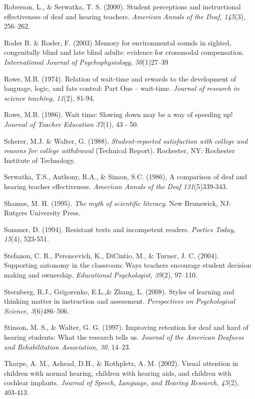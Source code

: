 \documentclass[11.5pt]{sig-alternate} %
\begin{document}
Roberson, L., \& Serwatka, T. S. (2000). Student perceptions and instructional effectiveness of deaf and hearing teachers. \textit{American Annals of the Deaf, 145}(3), 256–262. 

Roder B. \& Rosler, F. (2003) Memory for environmental sounds in sighted, congenitally blind and late blind adults: evidence for crossmodal compensation. \textit{International Journal of  Psychophysiology, 50}(1)27–39

Rowe, M.B. (1974). Relation of wait-time and rewards to the development of language, logic,  and fate control: Part One -- wait-time. \textit{Journal of research in science teaching, 11}(2), 81-94.

Rowe, M.B. (1986). Wait time: Slowing down may be a way of speeding up! \textit{Journal of Teacher Education 37}(1), 43 - 50.

Scherer, M.J. \& Walter, G. (1988). \textit{Student-reported satisfaction with college and reasons for college withdrawal} (Technical Report). Rochester, NY: Rochester Institute of Technology. 

Serwatka, T.S., Anthony, R.A., \& Simon, S.C. (1986), A comparison of deaf and hearing teacher effectiveness. \textit{American Annals of the Deaf 131}(5)339-343.

Shamos, M. H. (1995). \textit{The myth of scientific literacy}. New Brunswick, NJ: Rutgers University Press.

Sommer, D. (1994). Resistant texts and incompetent readers. \textit{Poetics Today, 15}(4), 523-551.  

Stefanou, C. R., Perencevich, K., DiCintio, M., \& Turner, J. C. (2004). Supporting autonomy in the classroom: Ways teachers encourage student decision making and ownership. \textit{Educational Psychologist, 39}(2), 97–110.

Sternberg, R.J., Grigorenko, E.L.,\& Zhang, L. (2008). Styles of learning and thinking matter in instruction and assessment. \textit{Perspectives on Psychological Science, 3}(6)486–506.

Stinson, M. S., \& Walter, G. G. (1997). Improving retention for deaf and hard of hearing students: What the research tells us. \textit{Journal of the American Deafness and Rehabilitation Association, 30}, 14–23.

Tharpe, A. M., Ashead, D.H., \& Rothpletz, A. M. (2002). Visual attention in children with normal hearing, children with hearing aids, and children with cochlear implants. \textit{Journal of Speech, Language, and Hearing Research, 45}(2), 403-413.
\end{document}
